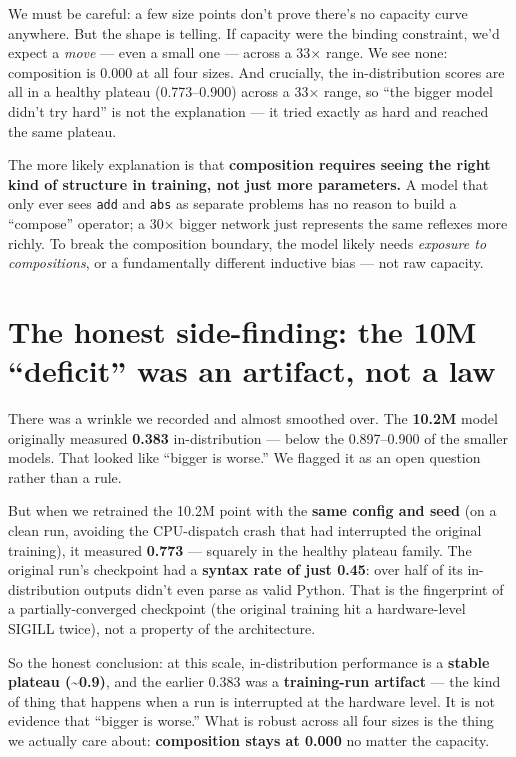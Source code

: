 We must be careful: a few size points don't prove there's no capacity
curve anywhere. But the shape is telling. If capacity were the binding
constraint, we'd expect a \emph{move} --- even a small one --- across a
33× range. We see none: composition is 0.000 at all four sizes. And
crucially, the in-distribution scores are all in a healthy plateau
(0.773--0.900) across a 33× range, so ``the bigger model didn't try
hard'' is not the explanation --- it tried exactly as hard and reached
the same plateau.

The more likely explanation is that \textbf{composition requires seeing
the right kind of structure in training, not just more parameters.} A
model that only ever sees \texttt{add} and \texttt{abs} as separate
problems has no reason to build a ``compose'' operator; a 30× bigger
network just represents the same reflexes more richly. To break the
composition boundary, the model likely needs \emph{exposure to
compositions}, or a fundamentally different inductive bias --- not raw
capacity.

\section{The honest side-finding: the 10M ``deficit'' was an artifact,
not a
law}\label{the-honest-side-finding-the-10m-deficit-was-an-artifact-not-a-law}

There was a wrinkle we recorded and almost smoothed over. The
\textbf{10.2M} model originally measured \textbf{0.383} in-distribution
--- below the 0.897--0.900 of the smaller models. That looked like
``bigger is worse.'' We flagged it as an open question rather than a
rule.

But when we retrained the 10.2M point with the \textbf{same config and
seed} (on a clean run, avoiding the CPU-dispatch crash that had
interrupted the original training), it measured \textbf{0.773} ---
squarely in the healthy plateau family. The original run's checkpoint
had a \textbf{syntax rate of just 0.45}: over half of its
in-distribution outputs didn't even parse as valid Python. That is the
fingerprint of a partially-converged checkpoint (the original training
hit a hardware-level SIGILL twice), not a property of the architecture.

So the honest conclusion: at this scale, in-distribution performance is
a \textbf{stable plateau (\textasciitilde0.9)}, and the earlier 0.383
was a \textbf{training-run artifact} --- the kind of thing that happens
when a run is interrupted at the hardware level. It is not evidence that
``bigger is worse.'' What is robust across all four sizes is the thing
we actually care about: \textbf{composition stays at 0.000} no matter
the capacity.

